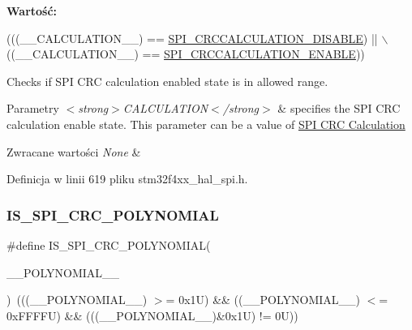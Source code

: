 {\bfseries Wartość\+:}
\begin{DoxyCode}
(((\_\_CALCULATION\_\_) == \hyperlink{group___s_p_i___c_r_c___calculation_ga9cd586b66473d7f207103a443280820e}{SPI\_CRCCALCULATION\_DISABLE}) || \(\backslash\)
                                                 ((\_\_CALCULATION\_\_) == 
      \hyperlink{group___s_p_i___c_r_c___calculation_ga431d368997c9c41e8923cbcd41b00123}{SPI\_CRCCALCULATION\_ENABLE}))
\end{DoxyCode}


Checks if S\+PI C\+RC calculation enabled state is in allowed range. 


\begin{DoxyParams}{Parametry}
{\em $<$strong$>$\+C\+A\+L\+C\+U\+L\+A\+T\+I\+O\+N$<$/strong$>$} & specifies the S\+PI C\+RC calculation enable state. This parameter can be a value of \hyperlink{group___s_p_i___c_r_c___calculation}{S\+PI C\+RC Calculation} \\
\hline
\end{DoxyParams}

\begin{DoxyRetVals}{Zwracane wartości}
{\em None} & \\
\hline
\end{DoxyRetVals}


Definicja w linii 619 pliku stm32f4xx\+\_\+hal\+\_\+spi.\+h.

\mbox{\label{group___s_p_i___private___macros_ga1b4b6bb5771cb0070af660d169d4ef09}} 
\subsubsection{\texorpdfstring{I\+S\+\_\+\+S\+P\+I\+\_\+\+C\+R\+C\+\_\+\+P\+O\+L\+Y\+N\+O\+M\+I\+AL}{IS\_SPI\_CRC\_POLYNOMIAL}}
{\footnotesize\ttfamily \#define I\+S\+\_\+\+S\+P\+I\+\_\+\+C\+R\+C\+\_\+\+P\+O\+L\+Y\+N\+O\+M\+I\+AL(\begin{DoxyParamCaption}\item[{}]{\+\_\+\+\_\+\+P\+O\+L\+Y\+N\+O\+M\+I\+A\+L\+\_\+\+\_\+ }\end{DoxyParamCaption})~(((\+\_\+\+\_\+\+P\+O\+L\+Y\+N\+O\+M\+I\+A\+L\+\_\+\+\_\+) $>$= 0x1\+U) \&\& ((\+\_\+\+\_\+\+P\+O\+L\+Y\+N\+O\+M\+I\+A\+L\+\_\+\+\_\+) $<$= 0x\+F\+F\+F\+F\+U) \&\& (((\+\_\+\+\_\+\+P\+O\+L\+Y\+N\+O\+M\+I\+A\+L\+\_\+\+\_\+)\&0x1\+U) != 0\+U))}



